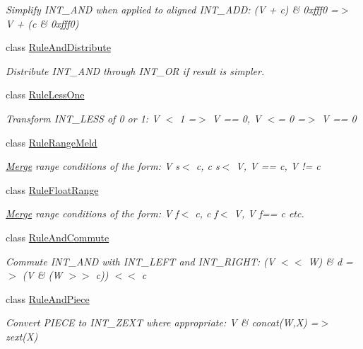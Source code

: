 \begin{DoxyCompactItemize}
\begin{DoxyCompactList}\small\item\em Simplify I\+N\+T\+\_\+\+A\+ND when applied to aligned I\+N\+T\+\_\+\+A\+DD\+: {\ttfamily (V + c) \& 0xfff0 =$>$ V + (c \& 0xfff0)} \end{DoxyCompactList}\item 
class \mbox{\hyperlink{class_rule_and_distribute}{Rule\+And\+Distribute}}
\begin{DoxyCompactList}\small\item\em Distribute I\+N\+T\+\_\+\+A\+ND through I\+N\+T\+\_\+\+OR if result is simpler. \end{DoxyCompactList}\item 
class \mbox{\hyperlink{class_rule_less_one}{Rule\+Less\+One}}
\begin{DoxyCompactList}\small\item\em Transform I\+N\+T\+\_\+\+L\+E\+SS of 0 or 1\+: {\ttfamily V $<$ 1 =$>$ V == 0, V $<$= 0 =$>$ V == 0} \end{DoxyCompactList}\item 
class \mbox{\hyperlink{class_rule_range_meld}{Rule\+Range\+Meld}}
\begin{DoxyCompactList}\small\item\em \mbox{\hyperlink{class_merge}{Merge}} range conditions of the form\+: {\ttfamily V s$<$ c, c s$<$ V, V == c, V != c} \end{DoxyCompactList}\item 
class \mbox{\hyperlink{class_rule_float_range}{Rule\+Float\+Range}}
\begin{DoxyCompactList}\small\item\em \mbox{\hyperlink{class_merge}{Merge}} range conditions of the form\+: {\ttfamily V f$<$ c, c f$<$ V, V f== c} etc. \end{DoxyCompactList}\item 
class \mbox{\hyperlink{class_rule_and_commute}{Rule\+And\+Commute}}
\begin{DoxyCompactList}\small\item\em Commute I\+N\+T\+\_\+\+A\+ND with I\+N\+T\+\_\+\+L\+E\+FT and I\+N\+T\+\_\+\+R\+I\+G\+HT\+: {\ttfamily (V $<$$<$ W) \& d =$>$ (V \& (W $>$$>$ c)) $<$$<$ c} \end{DoxyCompactList}\item 
class \mbox{\hyperlink{class_rule_and_piece}{Rule\+And\+Piece}}
\begin{DoxyCompactList}\small\item\em Convert P\+I\+E\+CE to I\+N\+T\+\_\+\+Z\+E\+XT where appropriate\+: {\ttfamily V \& concat(\+W,\+X) =$>$ zext(\+X)} \end{DoxyCompactList}\item 

\end{DoxyCompactItemize}

